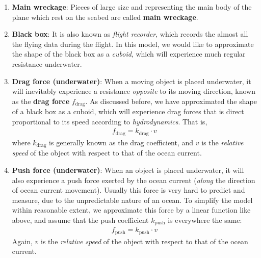\documentclass[a4paper,11pt]{article}
\begin{document}
\begin{spacing}{1.0}
\begin{enumerate}
	\item \textbf{Main wreckage}: Pieces of large size and representing the main body of the plane which rest on the seabed are called \textbf{main wreckage}.
	
	\item \textbf{Black box}: It is also known as \textit{flight recorder}, which records the almost all the flying data during the flight. In this model, we would like to approximate the shape of the black box as a \textit{cuboid}, which will experience much regular resistance underwater.
	
	\item \textbf{Drag force (underwater)}: When a moving object is placed underwater, it will inevitably experience a resistance \textit{opposite} to its moving direction, known as the \textbf{drag force} $f_\text{drag}$. As discussed before, we have approximated the shape of a black box as a cuboid, which will experience drag forces that is direct proportional to its speed according to \textit{hydrodynamics}. That is,
	\begin{align*}
	f_\text{drag} = k_\text{drag}\cdot v
 	\end{align*}
	where $k_\text{drag}$ is generally known as the drag coefficient, and $v$ is the \textit{relative speed} of the object with respect to that of the ocean current.
	
	\item \textbf{Push force (underwater)}: When an object is placed underwater, it will also experience a push force  exerted by the ocean current (\textit{along} the direction of ocean current movement). Usually this force is very hard to predict and measure, due to the unpredictable nature of an ocean. To simplify the model within reasonable extent, we approximate this force by a linear function like above, and assume that the push coefficient $k_\text{push}$ is everywhere the same:
	\begin{align*}
	f_\text{push} = k_\text{push} \cdot v
	\end{align*}
	Again, $v$ is the \textit{relative speed} of the object with respect to that of the ocean current.
	

\end{enumerate}
\end{spacing}
\end{document}
